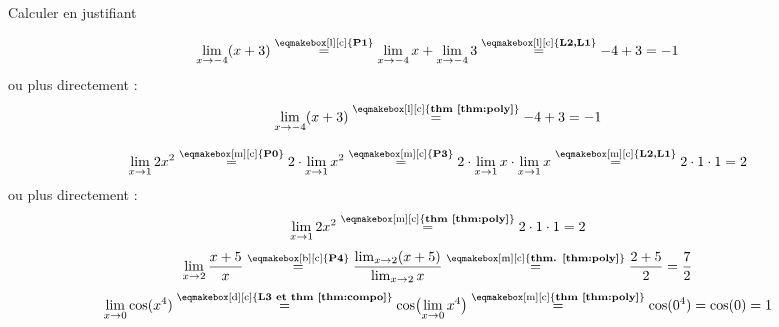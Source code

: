 \documentclass[a4paper,12pt]{article}
\begin{document}
\begin{exemple}
	\tcblower
Calculer en justifiant 
\begin{tasks}
	\task
\[
\lim_{x\to-4}(x+3)
\stackrel{\text{\eqmakebox[l][c]{{\bfseries{P1}}}}}{=}
\lim_{x\to-4}x+\lim_{x\to-4}3
\stackrel{\text{\eqmakebox[l][c]{{\bfseries{L2,L1}}}}}{=}
-4+3=-1
\]
ou plus directement :
\[
\lim_{x\to-4}(x+3)
\stackrel{\text{\eqmakebox[l][c]{{\bfseries{thm \ref{thm:poly}}}}}}{=}
-4+3=-1
\]


\task 

\[
\lim_{x\to1}2x^2
\stackrel{\text{\eqmakebox[m][c]{{\bfseries{P0}}}}}{=}
2\cdot\lim_{x\to1}x^2
\stackrel{\text{\eqmakebox[m][c]{{\bfseries{P3}}}}}{=}
2\cdot\lim_{x\to1}x\cdot\lim_{x\to1}x
\stackrel{\text{\eqmakebox[m][c]{{\bfseries{L2,L1}}}}}{=}
2\cdot1\cdot1=2
\]
ou plus directement :
\[
\lim_{x\to1}2x^2
\stackrel{\text{\eqmakebox[m][c]{{\bfseries{thm \ref{thm:poly}}}}}}{=}
2\cdot1\cdot1=2
\]
\task 
\[
\lim_{x\to2}\dfrac{x+5}{x}
\stackrel{\text{\eqmakebox[b][c]{{\bfseries{P4}}}}}{=}
\dfrac{\lim_{x\to2}(x+5)}{\lim_{x\to2}x}
\stackrel{\text{\eqmakebox[m][c]{{\bfseries thm. \ref{thm:poly}}}}}{=}
\dfrac{2+5}{2}
=\dfrac{7}{2}
\]
\task
\[
\lim_{x\to0}\cos(x^4)
\stackrel{\text{\eqmakebox[d][c]{{\bfseries{L3 et thm \ref{thm:compo}}}}}}{=}
\cos\bigl(\lim_{x\to0}x^4\bigr)
\stackrel{\text{\eqmakebox[m][c]{{\bfseries thm \ref{thm:poly}}}}}{=}
\cos(0^4)=\cos(0)=1
\]
\end{tasks}
\end{exemple}
\end{document}
